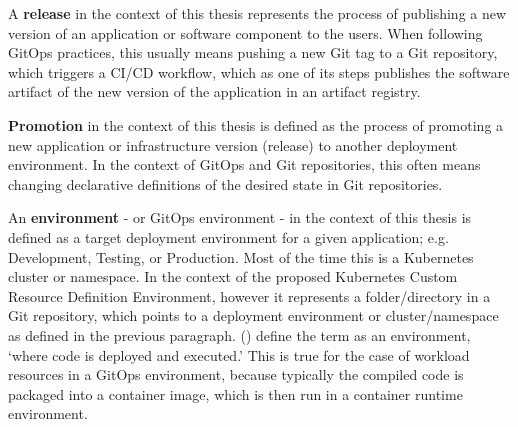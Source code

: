 
A \textbf{release} in the context of this thesis
represents the process of
publishing a new version of an application or software component
to the users.
When following GitOps practices,
this usually means
pushing a new Git tag to a Git repository,
which triggers a CI/CD workflow,
which as one of its steps publishes the software artifact of
the new version of the application in an artifact registry.


\textbf{Promotion} in the context of this thesis is defined as
the process of promoting a new application or infrastructure version (release)
to another deployment environment.
In the context of GitOps and Git repositories,
this often means changing declarative definitions of the desired state in Git repositories.


An \textbf{environment}
- or GitOps environment -
in the context of this thesis
is defined as a target deployment environment for a given application;
e.g. Development, Testing, or Production.
Most of the time this is a Kubernetes cluster or namespace.
In the context of the proposed Kubernetes Custom Resource Definition
Environment, however it represents a folder/directory in a Git repository,
which points to a deployment environment or cluster/namespace as defined
in the previous paragraph.
%
\citeauthor{gitopsAndKubernetes2021continuous} (\citeyear{gitopsAndKubernetes2021continuous})
define the term as an environment, \enquote*{where code is deployed and executed.}
\autocite{gitopsAndKubernetes2021continuous}
This is true for the case of workload resources in a GitOps environment,
because typically the compiled code is packaged into a container image,
which is then run in a container runtime environment.







